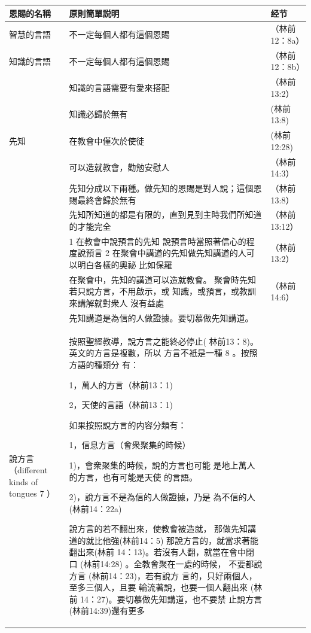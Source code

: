 \begin{table}[htbp]
\centering
\begin{tabular}{p{6.145em}|p{30.785em}|p{10.5em}}\toprule
 \multicolumn{1}{p{6.215em}|}{\textbf{恩賜的名稱}} & \multicolumn{1}{p{15.215em}|}{\textbf{原則簡單説明}} & \textbf{经节} \\\midrule
  
智慧的言語&不一定每個人都有這個恩賜&（林前12：8a）\\\midrule

知識的言語&不一定每個人都有這個恩賜&（林前12：8b）\\\midrule

&知識的言語需要有愛來搭配&（林前13:2）\\\midrule
&知識必歸於無有&(林前13:8)\\\midrule

先知&在教會中僅次於使徒&(林前12:28)\\\midrule
&可以造就教會，勸勉安慰人&（林前14:3）\\\midrule
&先知分成以下兩種。做先知的恩賜是對人說；這個恩賜最終會歸於無有&（林前13:8）\\\midrule
&先知所知道的都是有限的，直到見到主時我們所知道
的才能完全&（林前13:12）\\\midrule
&1 在教會中說預言的先知 說預言時當照著信心的程度說預言
2 在聚會中講道的先知做先知講道的人可以明白各樣的奧祕
比如保羅&（林前13:2）\\\midrule
&在聚會中，先知的講道可以造就教會。
聚會時先知若只說方言，不用啟示，或
知識，或預言，或教訓來講解就對衆人
沒有益處&（林前14:6）\\\midrule
&先知講道是為信的人做證據。要切慕做先知講道。&\\\midrule

說方言（different kinds of tongues 7 ）&

按照聖經教導，說方言之能終必停止(
林前13：8)。英文的方言是複數，所以
方言不衹是一種 8 。按照方語的種類分
有：

1，萬人的方言（林前13：1)

2，天使的言語（林前13：1)

如果按照說方言的内容分類有：



1，信息方言（會衆聚集的時候）

1)，會衆聚集的時候，說的方言也可能
是地上萬人的方言，也有可能是天使
的言語。

2)，說方言不是為信的人做證據，乃是
為不信的人(林前14：22a)

說方言的若不翻出來，使教會被造就，
那做先知講道的就比他強(林前14：5)
那說方言的，就當求著能翻出來(林前
14：13)。若沒有人翻，就當在會中閉口
(林前14:28) 。全教會聚在一處的時候，
不要都說方言 (林前14：23)，若有說方
言的，只好兩個人，至多三個人，且要
輪流著說，也要一個人翻出來 (林前
14：27)。要切慕做先知講道，也不要禁
止說方言(林前14:39)還有更多



\end{tabular}
\end{table}
